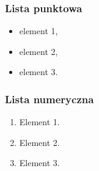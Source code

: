 \subsubsection{Lista punktowa}

\begin{itemize}
	\item element 1,
	\item element 2,
	\item element 3.
\end{itemize}

\subsubsection{Lista numeryczna}

\begin{enumerate}
	\item Element 1.
	\item Element 2.
	\item Element 3.
\end{enumerate}
